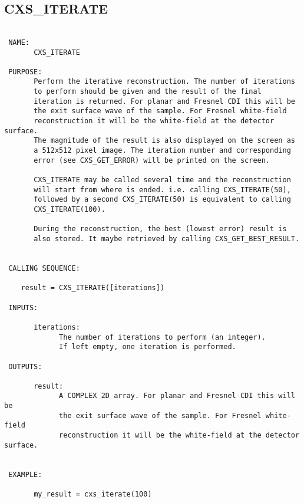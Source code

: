 





  
 
\subsection{CXS\_ITERATE}
\begin{verbatim}

 NAME:
       CXS_ITERATE

 PURPOSE:
       Perform the iterative reconstruction. The number of iterations
       to perform should be given and the result of the final
       iteration is returned. For planar and Fresnel CDI this will be
       the exit surface wave of the sample. For Fresnel white-field
       reconstruction it will be the white-field at the detector surface.
       The magnitude of the result is also displayed on the screen as
       a 512x512 pixel image. The iteration number and corresponding
       error (see CXS_GET_ERROR) will be printed on the screen.

       CXS_ITERATE may be called several time and the reconstruction
       will start from where is ended. i.e. calling CXS_ITERATE(50),
       followed by a second CXS_ITERATE(50) is equivalent to calling
       CXS_ITERATE(100).

       During the reconstruction, the best (lowest error) result is
       also stored. It maybe retrieved by calling CXS_GET_BEST_RESULT.
 

 CALLING SEQUENCE:

	result = CXS_ITERATE([iterations])

 INPUTS:

       iterations: 
             The number of iterations to perform (an integer). 
             If left empty, one iteration is performed.

 OUTPUTS:

       result:
             A COMPLEX 2D array. For planar and Fresnel CDI this will be
             the exit surface wave of the sample. For Fresnel white-field
             reconstruction it will be the white-field at the detector surface.


 EXAMPLE:

       my_result = cxs_iterate(100)

\end{verbatim}






  
 
